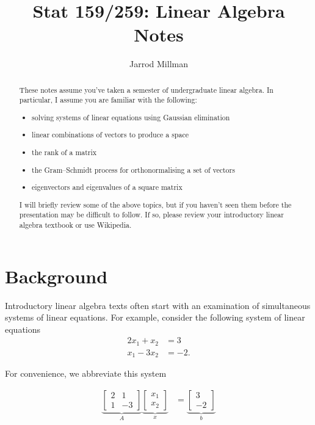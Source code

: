 \documentclass[]{article}
\title{Stat 159/259: Linear Algebra Notes}
\author{Jarrod Millman}
\theoremstyle{plain}
\theoremstyle{definition}
\theoremstyle{remark}
\begin{document}
\maketitle

\begin{abstract}

These notes assume you've taken a semester of undergraduate linear algebra. In
particular, I assume you are familiar with the following:

\begin{itemize}
\itemsep1pt\parskip0pt
\item solving systems of linear equations using Gaussian elimination
\item linear combinations of vectors to produce a space
\item the rank of a matrix
\item the Gram–Schmidt process for orthonormalising a set of vectors
\item eigenvectors and eigenvalues of a square matrix 
\end{itemize}

I will briefly review some of the above topics, but if you haven't seen them
before the presentation may be difficult to follow.  If so, please review your
introductory linear algebra textbook or use Wikipedia.

\end{abstract}

\section{Background}\label{background}

Introductory linear algebra texts often start with an examination of
simultaneous systems of linear equations.  For example, consider
the following system of linear equations
\begin{align*}
2x_1 + x_2 &= 3 \\
x_1 - 3x_2 &= -2.
\end{align*}

For convenience, we abbreviate this system

\begin{align*}
\underbrace{\begin{bmatrix} 2 & 1 \\ 1 & -3 \end{bmatrix}}_A \underbrace{\begin{bmatrix}x_1 \\ x_2\end{bmatrix}}_x
  &= \underbrace{\begin{bmatrix} 3 \\ -2\end{bmatrix}}_b
\end{align*}
\end{document}
